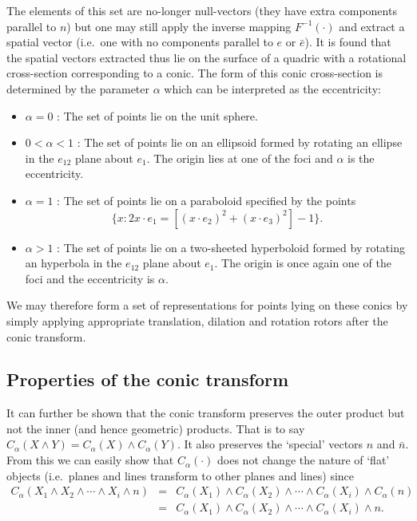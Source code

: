 The elements of this set are no-longer null-vectors (they have extra
components parallel to $n$) but one may still apply the inverse
mapping $F^{-1}(\cdot)$ and extract a spatial vector (i.e.\ 
one with no components parallel to $e$ or $\bar{e}$). It is found
\cite{anthonyChina, jic23fyr} that the spatial vectors extracted thus lie
on the surface of a quadric with a rotational cross-section corresponding
to a conic. The form of this conic cross-section is determined by the
parameter $\alpha$ which can be interpreted as the
eccentricity:
\begin{itemize}
\item $\alpha = 0$ : The set of points lie on the unit sphere.
\item $0 < \alpha < 1$ : The set of points lie on an ellipsoid formed
by rotating an ellipse in the $e_{12}$ plane about $e_1$. The origin
lies at one of the foci and $\alpha$ is the eccentricity.
\item $\alpha = 1$ : The set of points lie on a paraboloid specified
by the points 
\[\{ x : 2 x\cdot e_1 = [(x \cdot e_2)^2 + (x \cdot e_3)^2] -1\}.\]
\item $\alpha > 1$ : The set of points lie on a two-sheeted hyperboloid formed
by rotating an hyperbola in the $e_{12}$ plane about $e_1$. The origin
is once again one of the foci and the eccentricity is $\alpha$.
\end{itemize}
We may therefore form a set of representations for points lying on 
these conics by simply applying appropriate translation,
dilation and rotation rotors after the conic transform.

\subsection{Properties of the conic transform}

It can further be shown \cite{jic23fyr} that the conic transform preserves
the outer product but not the inner (and hence geometric) products. That
is to say $C_\alpha(X \wedge Y) = C_\alpha(X) \wedge C_\alpha(Y)$. It also preserves the 
`special' vectors $n$ and $\bar{n}$. From this we can easily show that
$C_\alpha(\cdot)$ does not change the nature of `flat' objects 
(i.e.\ planes and lines transform to other planes and
 lines) since
\begin{eqnarray*}
C_\alpha\left(X_1 \wedge X_2 \wedge \cdots \wedge X_i \wedge n \right) & = &
C_\alpha(X_1) \wedge C_\alpha(X_2) \wedge \cdots \wedge C_\alpha(X_i) \wedge C_\alpha(n) \\
&=& C_\alpha(X_1) \wedge C_\alpha(X_2) \wedge \cdots \wedge C_\alpha(X_i) \wedge n.
\end{eqnarray*}


